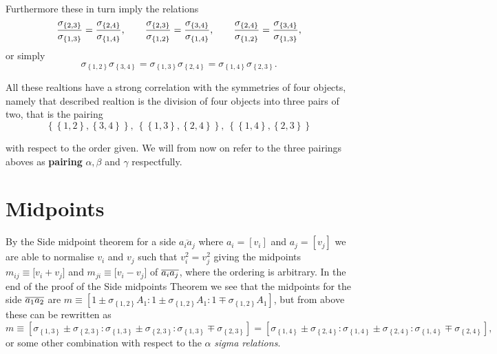 \documentclass{unswthesis}
\begin{document}
Furthermore these in turn imply the relations%
\begin{equation}
\frac{\sigma _{\left\{ 2,3\right\} }}{\sigma _{\left\{ 1,3\right\} }}=\frac{%
\sigma _{\left\{ 2,4\right\} }}{\sigma _{\left\{ 1,4\right\} }},\qquad \frac{%
\sigma _{\left\{ 2,3\right\} }}{\sigma _{\left\{ 1,2\right\} }}=\frac{\sigma
_{\left\{ 3,4\right\} }}{\sigma _{\left\{ 1,4\right\} }},\qquad \frac{\sigma
_{\left\{ 2,4\right\} }}{\sigma _{\left\{ 1,2\right\} }}=\frac{\sigma
_{\left\{ 3,4\right\} }}{\sigma _{\left\{ 1,3\right\} }},
\label{Sigma Relations}
\end{equation}%
or simply%
\begin{equation*}
\sigma _{\left\{ 1,2\right\} }\sigma _{\left\{ 3,4\right\} }=\sigma
_{\left\{ 1,3\right\} }\sigma _{\left\{ 2,4\right\} }=\sigma _{\left\{
1,4\right\} }\sigma _{\left\{ 2,3\right\} }. 
\end{equation*}

All these realtions have a strong correlation with the symmetries of four
objects, namely that described realtion is the division of four objects into
three pairs of two, that is the pairing%
\begin{equation*}
\left\{ \left\{ 1,2\right\} ,\left\{ 3,4\right\} \right\} ,~\left\{ \left\{
1,3\right\} ,\left\{ 2,4\right\} \right\} ,~\left\{ \left\{ 1,4\right\}
,\left\{ 2,3\right\} \right\} 
\end{equation*}

with respect to the order given. We will from now on refer to the three
pairings aboves as \textbf{pairing }$\alpha ,\beta $ and $\gamma $
respectfully.

\section{Midpoints}

By the Side midpoint theorem for a side $\overline{a_{i}a_{j}}$ where $%
a_{i}=[v_{i}]$ and $a_{j}=[v_{j}]$ we are able to normalise $v_{i}$ and $%
v_{j}$ such that $v_{i}^{2}=v_{j}^{2}$ giving the midpoints $m_{ij}\equiv
\lbrack v_{i}+v_{j}]$ and $m_{ji}\equiv \lbrack v_{i}-v_{j}]$ of $\overline{%
a_{i}a_{j}}$, where the ordering is arbitrary. In the end of the proof of
the Side midpoints Theorem we see that the midpoints for the side $\overline{%
a_{1}a_{2}}$ are $m\equiv \left[ 1\pm \sigma _{\left\{ 1,2\right\}
}A_{1}:1\pm \sigma _{\left\{ 1,2\right\} }A_{1}:1\mp \sigma _{\left\{
1,2\right\} }A_{1}\right] $, but from above these can be rewritten as 
\begin{equation*}
m\equiv \left[ \sigma _{\left\{ 1,3\right\} }\pm \sigma _{\left\{
2,3\right\} }:\sigma _{\left\{ 1,3\right\} }\pm \sigma _{\left\{ 2,3\right\}
}:\sigma _{\left\{ 1,3\right\} }\mp \sigma _{\left\{ 2,3\right\} }\right] =%
\left[ \sigma _{\left\{ 1,4\right\} }\pm \sigma _{\left\{ 2,4\right\}
}:\sigma _{\left\{ 1,4\right\} }\pm \sigma _{\left\{ 2,4\right\} }:\sigma
_{\left\{ 1,4\right\} }\mp \sigma _{\left\{ 2,4\right\} }\right] , 
\end{equation*}%
or some other combination with respect to the $\alpha $ \textit{sigma
relations}.
\end{document}

